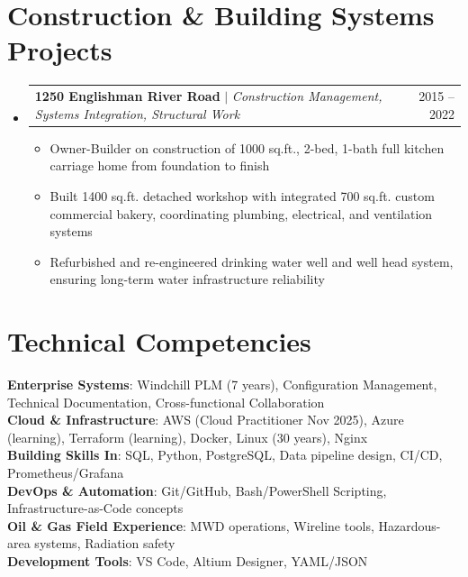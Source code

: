\documentclass[letterpaper,11pt]{article}
\makeatletter
\newcommand{\resumeItem}[1]{
  \item\small{
    {#1 \vspace{-2pt}}
  }
}
\newcommand{\resumeProjectHeading}[2]{
    \item
    \begin{tabular*}{0.97\textwidth}{l@{\extracolsep{\fill}}r}
      \small#1 & #2 \\
    \end{tabular*}\vspace{-7pt}
}
\newcommand{\resumeSubHeadingListStart}{\begin{itemize}[leftmargin=0.15in, label={}]}
\newcommand{\resumeSubHeadingListEnd}{\end{itemize}}
\newcommand{\resumeItemListStart}{\begin{itemize}}
\newcommand{\resumeItemListEnd}{\end{itemize}\vspace{-5pt}}
\makeatother
\begin{document}
\section{Construction \& Building Systems Projects}
    \resumeSubHeadingListStart
      \resumeProjectHeading
          {\textbf{1250 Englishman River Road} $|$ \emph{Construction Management, Systems Integration, Structural Work}}{2015 -- 2022}
          \resumeItemListStart
            \resumeItem{Owner-Builder on construction of 1000 sq.ft., 2-bed, 1-bath full kitchen carriage home from foundation to finish}
            \resumeItem{Built 1400 sq.ft. detached workshop with integrated 700 sq.ft. custom commercial bakery, coordinating plumbing, electrical, and ventilation systems}
            \resumeItem{Refurbished and re-engineered drinking water well and well head system, ensuring long-term water infrastructure reliability}
          \resumeItemListEnd
    \resumeSubHeadingListEnd


\section{Technical Competencies}
 \begin{itemize}[leftmargin=0.15in, label={}]
    \small{\item{
     \textbf{Enterprise Systems}{: Windchill PLM (7 years), Configuration Management, Technical Documentation, Cross-functional Collaboration} \\
     \textbf{Cloud \& Infrastructure}{: AWS (Cloud Practitioner Nov 2025), Azure (learning), Terraform (learning), Docker, Linux (30 years), Nginx} \\
     \textbf{Building Skills In}{: SQL, Python, PostgreSQL, Data pipeline design, CI/CD, Prometheus/Grafana} \\
     \textbf{DevOps \& Automation}{: Git/GitHub, Bash/PowerShell Scripting, Infrastructure-as-Code concepts} \\
     \textbf{Oil \& Gas Field Experience}{: MWD operations, Wireline tools, Hazardous-area systems, Radiation safety} \\
     \textbf{Development Tools}{: VS Code, Altium Designer, YAML/JSON}
    }}
 \end{itemize}


\end{document}
